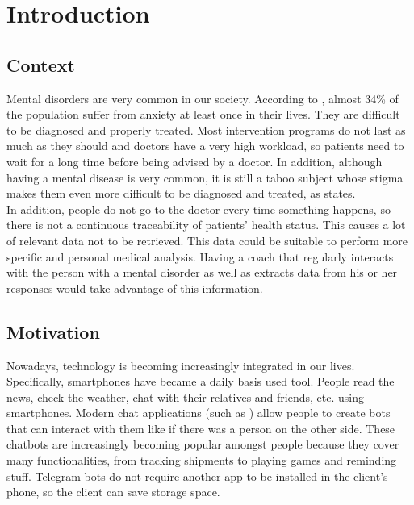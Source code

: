 \documentclass[12pt,english]{article}
\begin{document}


\thispagestyle{empty}
\newpage
\tableofcontents{}
\newpage
\section{Introduction}
\subsection{Context}

Mental disorders are very common in our society. According to \cite{Bandelow2015}, almost 34\% of the population suffer from anxiety at least once in their lives. They are difficult to be diagnosed and properly treated. Most intervention programs do not last as much as they should and doctors have a very high workload, so patients need to wait for a long time before being advised by a doctor. In addition, although having a mental disease is very common, it is still a taboo subject whose stigma makes them even more difficult to be diagnosed and treated, as \cite{Davies2000} states.\\

In addition, people do not go to the doctor every time something happens, so there is not a continuous traceability of patients' health status. This causes a lot of relevant data not to be retrieved. This data could be suitable to perform more specific and personal medical analysis. Having a coach that regularly interacts with the person with a mental disorder as well as extracts data from his or her responses would take advantage of this information.


\subsection{Motivation}

Nowadays, technology is becoming increasingly integrated in our lives. Specifically, smartphones have became a daily basis used tool. People read the news, check the weather, chat with their relatives and friends, etc. using smartphones. Modern chat applications (such as \cite{Telegram}) allow people to create bots that can interact with them like if there was a person on the other side. These chatbots are increasingly becoming popular amongst people because they cover many functionalities, from tracking shipments to playing games and reminding stuff. Telegram bots do not require another app to be installed in the client's phone, so the client can save storage space.\\
\end{document}
